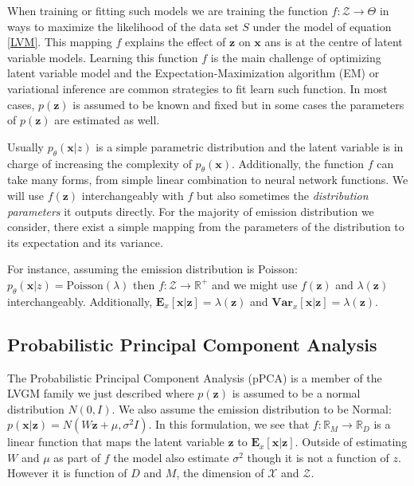 \documentclass{article}
\newcommand{\Vx}{\textbf{Var}_x}
\newcommand{\Ex}{\textbf{E}_x}
\newcommand{\x}{\mathbf{x}}
\newcommand{\z}{\mathbf{z}}
\begin{document}
\bigskip

When training or fitting such models we are training the function $f:\mathcal{Z} \rightarrow \Theta$ in ways to maximize the likelihood of the data set $S$ under the model of equation \ref{LVM}. This mapping $f$ explains the effect of $\z$ on $\x$ ans is at the centre of latent variable models. Learning this function $f$ is the main challenge of optimizing latent variable model and the Expectation-Maximization algorithm (EM) or variational inference are common strategies to fit learn such function. In most cases, $p(\z)$ is assumed to be known and fixed but in some cases the parameters of $p(\z)$ are estimated as well.

\bigskip

Usually $p_\theta(\x|z)$ is a simple parametric distribution and the latent variable is in charge of increasing the complexity of $p_\theta(\x)$. Additionally, the function $f$ can take many forms, from simple linear combination to neural network functions. We will use $f(\z)$ interchangeably with $f$ but also sometimes the \textit{distribution parameters} it outputs directly. For the majority of emission distribution we consider, there exist a simple mapping from the parameters of the distribution to its expectation and its variance.

\bigskip

For instance, assuming the emission distribution is Poisson: $p_\theta(\x|z) = \text{Poisson}(\lambda)$ then $f: \mathcal{Z} \rightarrow \mathbb{R}^+$ and we might use $f(\z)$ and $\lambda(\z)$ interchangeably. Additionally, $\Ex[\x|\z] = \lambda(\z)$ and $ \Vx[\x|\z] = \lambda(\z)$. 


\subsection{Probabilistic Principal Component Analysis}

The Probabilistic Principal Component Analysis (pPCA) \cite{tipping99,Bishop07} is a member of the LVGM family we just described where $p(\z)$ is assumed to be a normal distribution $N(0,I)$. We also assume the emission distribution to be Normal: $p(\x|\z) = N(W\z+\mu,\sigma^2I)$. In this formulation, we see that $f: \mathbb{R}_M \rightarrow \mathbb{R}_D$ is a linear function that maps the latent variable $\z$ to $\Ex[\x|\z]$. Outside of estimating $W$ and $\mu$ as part of $f$ the model also estimate $\sigma^2$ though it is not a function of $z$. However it is function of $D$ and $M$, the dimension of $\mathcal{X}$ and $\mathcal{Z}$. 
\end{document}
